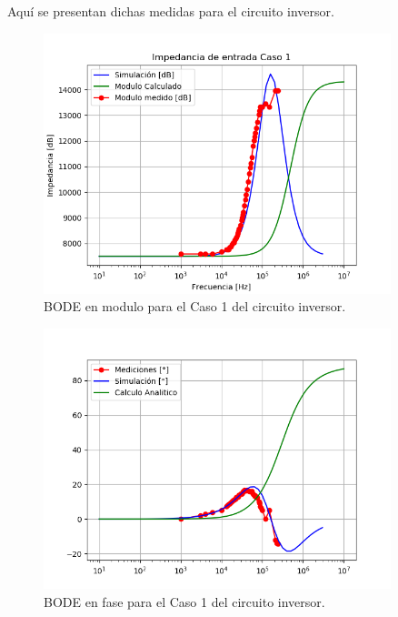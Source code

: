 Aquí se presentan dichas medidas para el circuito inversor.

\begin{figure}[H]	
	\centering
	\includegraphics[width=0.9\textwidth]{Ejercicio1/Imagenes/ZinC1.png}
	\caption{BODE en modulo para el Caso 1 del circuito inversor.}
	\label{fig:CompZinC1}
\end{figure} 

\begin{figure}[H]	
	\centering
	\includegraphics[width=0.9\textwidth]{Ejercicio1/Imagenes/ZinphC1.png}
	\caption{BODE en fase para el Caso 1 del circuito inversor.}
	\label{fig:CompZinphC1}
\end{figure} 

